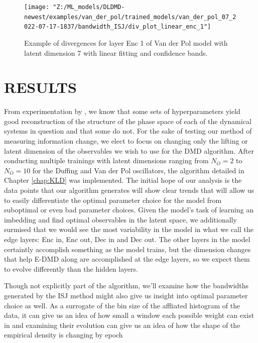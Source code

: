 \begin{figure}[ht]
    \centering
    \begin{minipage}{\textwidth}
        \texttt{[image: "Z:/ML\_models/DLDMD-newest/examples/van\_der\_pol/trained\_models/van\_der\_pol\_07\_2022-07-17-1837/bandwidth\_ISJ/div\_plot\_linear\_enc\_1"]}
    \end{minipage}
    \caption{Example of divergences for layer Enc 1 of Van der Pol model with latent dimension 7 
    with linear fitting and confidence bands.}
    \label{fig:divergence of model example}
\end{figure}


\chapter{RESULTS}
\label{chap:results}
From experimentation by \cite{lago}, we know that some sets of hyperparameters yield good reconstruction
of the structure of the phase space of each of the dynamical systems in question and that some do not. For
the sake of testing our method of measuring information change, we elect to focus on changing only the 
lifting or latent dimension of the observables we wish to use for the DMD algorithm. After conducting 
multiple trainings with latent dimensions ranging from $N_O = 2$ to $N_O = 10$ for the Duffing and Van der 
Pol oscillators, the algorithm detailed in Chapter \ref{chap:KLD} was implemented. The initial hope of our 
analysis is the data points that our algorithm generates 
will show clear trends that will allow us to easily differentiate the optimal parameter choice for the 
model from suboptimal or even bad parameter choices. Given the model's task of learning an imbedding and 
find optimal observables in the latent space, we additionally surmised that we would see the most 
variability in the model in what we call the edge layers: Enc in, Enc out, Dec in and Dec out. The 
other layers in the model certaintly accomplish something as the model trains, but the dimension changes 
that help E-DMD along are accomplished at the edge layers, so we expect them to evolve differently than
the hidden layers. 

Though not explicitly
part of the algorithm, we'll examine how the bandwidths generated by the ISJ method might also give us 
insight into optimal parameter choice as well. As a surrogate of the bin size of the affliated histogram
of the data, it can give us an idea of how small a window each possible weight can exist in and examining
their evolution can give us an idea of how the shape of the empirical density is changing by epoch


